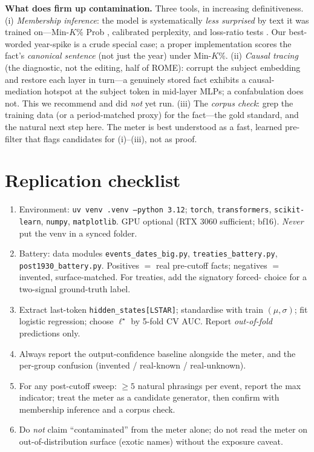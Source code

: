 \documentclass[11pt]{article}
\newcommand{\code}[1]{\texttt{\small #1}}
\begin{document}
\textbf{What does firm up contamination.} Three tools, in increasing definitiveness. (i) \emph{Membership inference}:
the model is systematically \emph{less surprised} by text it was trained on---Min-$K\%$ Prob \cite{minkprob}, calibrated
perplexity, and loss-ratio tests \cite{carlini21,carlini23}. Our best-worded year-spike is a crude special case; a
proper implementation scores the fact's \emph{canonical sentence} (not just the year) under Min-$K\%$. (ii)
\emph{Causal tracing} \cite{rome} (the diagnostic, not the editing, half of ROME): corrupt the subject embedding and
restore each layer in turn---a genuinely stored fact exhibits a causal-mediation hotspot at the subject token in
mid-layer MLPs; a confabulation does not. This we recommend and did \emph{not} yet run. (iii) The \emph{corpus check}:
grep the training data (or a period-matched proxy) for the fact---the gold standard, and the natural next step here.
The meter is best understood as a fast, learned pre-filter that flags candidates for (i)--(iii), not as proof.

\section{Replication checklist}\label{sec:repro}
\begin{enumerate}\itemsep2pt
\item Environment: \code{uv venv .venv --python 3.12}; \code{torch}, \code{transformers}, \code{scikit-learn},
  \code{numpy}, \code{matplotlib}. GPU optional (RTX 3060 sufficient; bf16). \emph{Never} put the venv in a synced folder.
\item Battery: data modules \code{events\_dates\_big.py}, \code{treaties\_battery.py}, \code{post1930\_battery.py}.
  Positives $=$ real pre-cutoff facts; negatives $=$ invented, surface-matched. For treaties, add the signatory forced-
  choice for a two-signal ground-truth label.
\item Extract last-token \code{hidden\_states[LSTAR]}; standardise with train $(\mu,\sigma)$; fit logistic regression;
  choose $\ell^\star$ by 5-fold CV AUC. Report \emph{out-of-fold} predictions only.
\item Always report the output-confidence baseline alongside the meter, and the per-group confusion
  (invented / real-known / real-unknown).
\item For any post-cutoff sweep: $\ge 5$ natural phrasings per event, report the max indicator; treat the meter as a
  candidate generator, then confirm with membership inference and a corpus check.
\item Do \emph{not} claim ``contaminated'' from the meter alone; do not read the meter on out-of-distribution surface
  (exotic names) without the exposure caveat.
\end{enumerate}
\end{document}
